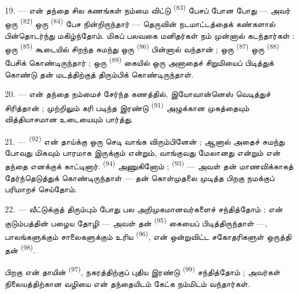 19. --- என் தந்தை சில கணங்கள் நம்மை விட்டு  \textsuperscript{(83)} பேசப் போன போது — அவர் ஒரு
 \textsuperscript{(82)} ஒரு
 \textsuperscript{(84)} பேச நின்றிருந்தார் —
தெருவின் நடமாட்டத்தைக் கண்களால் பின்தொடர்ந்து மகிழ்ந்தோம். மிகப்
பலவகை மனிதர்கள் நம் முன்னால் கடந்தார்கள் : ஒரு  \textsuperscript{(85)} கூடையில் சிறந்த
 சுமந்து ஒரு 
\textsuperscript{(86)} பின்னால் வந்தான் ; ஒரு  \textsuperscript{(87)} ஒரு 
\textsuperscript{(88)} பேசிக் கொண்டிருந்தார் ; ஒரு 
\textsuperscript{(89)} கையில் ஒரு அனாதைச் சிறுமியைப் பிடித்துக்
கொண்டு தன் மடத்திற்குத் திரும்பிக் கொண்டிருந்தாள்.

\VUsaut{3.0mm}

20. --- என் தந்தை நம்மைச் சேர்ந்த கணத்தில், இயோவான்னெஸ் வெடித்துச்
சிரித்தான் ; முற்றிலும் கரி படிந்த இரண்டு  \textsuperscript{(91)} அழுக்கான முகத்தையும்
வித்தியாசமான உடையையும் பார்த்து.

21. ---  \textsuperscript{(92)} என் தாய்க்கு ஒரு
செடி வாங்க விரும்பினேன் ; ஆனால் அதைச் சுமந்து போவது மிகவும்
பாரமாக இருக்கும் என்றும்,  வாங்குவது
மேலானது என்றும் என் தந்தை எனக்குக் காட்டினார்.
 \textsuperscript{(94)} அணுகினோம் ;
 \textsuperscript{(93)} — அவள் தன் மாணவிக்காகத்
தேர்ந்தெடுத்துக் கொண்டிருந்தாள் — தன் கொள்முதலை முடித்த பிறகு
நமக்குப் பரிமாறச் செய்தோம்.

22. --- வீட்டுக்குத் திரும்பும் போது பல அறிமுகமானவர்களைச்
சந்தித்தோம் : என் குடும்பத்தின் பழைய தோழி — அவள் தன்
 \textsuperscript{(95)} கையைப்
பிடித்திருந்தாள் —, பாலங்களுக்கும் சாலைகளுக்கும் உரிய
 \textsuperscript{(96)}, என் ஒன்றுவிட்ட
சகோதரிகளுள் ஒருத்தி தன் 
\textsuperscript{(98)}.

பிறகு என் தாயின்  \textsuperscript{(97)},
நகரத்திற்குப் புதிய இரண்டு 
\textsuperscript{(99)} சந்தித்தோம் ; அவர்கள் நிலையத்திற்கான வழியை
என் தந்தையிடம் கேட்க நம்மிடம் வந்தார்கள்.

\VUsaut{6.0mm}
\VUfilet{22mm}
